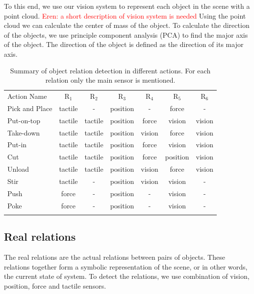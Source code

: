 To this end, we use our vision system to represent each object in the scene with a point cloud.
\textcolor{red}{Eren: a short description of vision system is needed}
Using the point cloud we can calculate the center of mass of the object.
To calculate the direction of the objects, we use principle component analysis (PCA) to find the major axis of the object.
The direction of the object is defined as the direction of its major axis.

\begin{table}
\caption{Summary of object relation detection in different actions. For each relation only the main sensor is mentioned.}
\begin{tabular}{ lcccccc }
\hline\noalign{\smallskip}
 Action Name &  $\text{R}_1$ & $\text{R}_2$ &$\text{R}_3$ &$\text{R}_4$ &$\text{R}_5$&$\text{R}_6$ \\
\noalign{\smallskip}\hline\noalign{\smallskip}
 Pick and Place & tactile & -       & position & -     &  force & - \\
 Put-on-top     & tactile & tactile & position & force &  vision & vision \\
 Take-down      & tactile & tactile & position & vision&  force & vision \\
 Put-in         & tactile & tactile & position & force &  vision & vision \\
 Cut            & tactile & tactile & position & force &  position & vision \\
 Unload         & tactile & tactile & position & vision&  force & vision \\
 Stir           & tactile & -       & position & vision&  vision & - \\
 Push           & force   & -       & position & -     &  vision & - \\
 Poke           & force   & -       & position & -     &  vision & - \\
\noalign{\smallskip}\hline
\end{tabular}
\label{tab:relation_detection}
\end{table}
\subsection{Real relations}
\label{sec:real_relations}
The real relations are the actual relations between pairs of objects.
These relations together form a symbolic representation of the scene, or in other words, the current state of system.
To detect the relations, we use combination of vision, position, force and tactile sensors.

